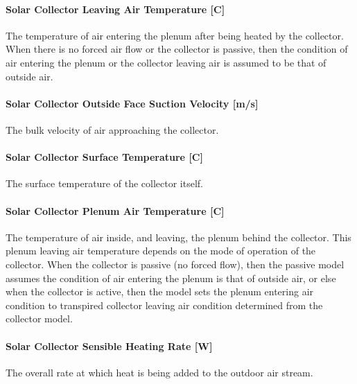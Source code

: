 \paragraph{Solar Collector Leaving Air Temperature {[}C{]}}\label{solar-collector-leaving-air-temperature-c}

The temperature of air entering the plenum after being heated by the collector. When there is no forced air flow or the collector is passive, then the condition of air entering the plenum or the collector leaving air is assumed to be that of outside air.

\paragraph{Solar Collector Outside Face Suction Velocity {[}m/s{]}}\label{solar-collector-outside-face-suction-velocity-ms}

The bulk velocity of air approaching the collector.

\paragraph{Solar Collector Surface Temperature {[}C{]}}\label{solar-collector-surface-temperature-c}

The surface temperature of the collector itself.

\paragraph{Solar Collector Plenum Air Temperature {[}C{]}}\label{solar-collector-plenum-air-temperature-c}

The temperature of air inside, and leaving, the plenum behind the collector. This plenum leaving air temperature depends on the mode of operation of the collector. When the collector is passive (no forced flow), then the passive model assumes the condition of air entering the plenum is that of outside air, or else when the collector is active, then the model sets the plenum entering air condition to transpired collector leaving air condition determined from the collector model.

\paragraph{Solar Collector Sensible Heating Rate {[}W{]}}\label{solar-collector-sensible-heating-rate-w}

The overall rate at which heat is being added to the outdoor air stream.

